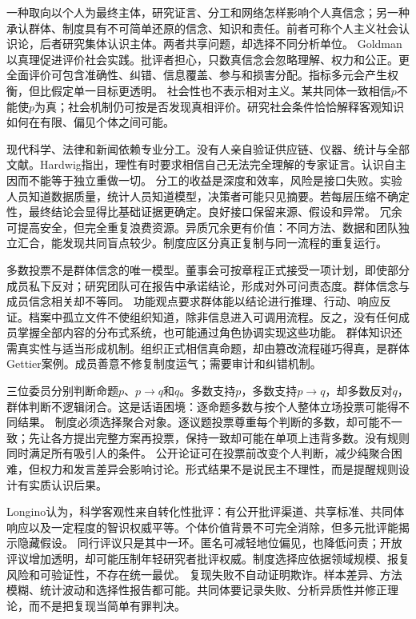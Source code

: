 一种取向以个人为最终主体，研究证言、分工和网络怎样影响个人真信念；另一种承认群体、制度具有不可简单还原的信念、知识和责任。前者可称个人主义社会认识论，后者研究集体认识主体。两者共享问题，却选择不同分析单位。 Goldman以真理促进评价社会实践\parencite{goldman1999}。批评者担心，只数真信念会忽略理解、权力和公正。更全面评价可包含准确性、纠错、信息覆盖、参与和损害分配。指标多元会产生权衡，但比假定单一目标更透明。 社会性也不表示相对主义。某共同体一致相信$p$不能使$p$为真；社会机制仍可按是否发现真相评价。研究社会条件恰恰解释客观知识如何在有限、偏见个体之间可能。

现代科学、法律和新闻依赖专业分工。没有人亲自验证供应链、仪器、统计与全部文献。Hardwig指出，理性有时要求相信自己无法完全理解的专家证言\parencite{hardwig1985}。认识自主因而不能等于独立重做一切。 分工的收益是深度和效率，风险是接口失败。实验人员知道数据质量，统计人员知道模型，决策者可能只见摘要。若每层压缩不确定性，最终结论会显得比基础证据更确定。良好接口保留来源、假设和异常。 冗余可提高安全，但完全重复浪费资源。异质冗余更有价值：不同方法、数据和团队独立汇合，能发现共同盲点较少。制度应区分真正复制与同一流程的重复运行。

多数投票不是群体信念的唯一模型。董事会可按章程正式接受一项计划，即使部分成员私下反对；研究团队可在报告中承诺结论，形成对外可问责态度。群体信念与成员信念相关却不等同。 功能观点要求群体能以结论进行推理、行动、响应反证。档案中孤立文件不使组织知道，除非信息进入可调用流程。反之，没有任何成员掌握全部内容的分布式系统，也可能通过角色协调实现这些功能。 群体知识还需真实性与适当形成机制。组织正式相信真命题，却由篡改流程碰巧得真，是群体Gettier案例。成员善意不修复制度运气；需要审计和纠错机制。

三位委员分别判断命题$p$、$p\rightarrow q$和$q$。多数支持$p$，多数支持$p\rightarrow q$，却多数反对$q$，群体判断不逻辑闭合。这是话语困境：逐命题多数与按个人整体立场投票可能得不同结果。 制度必须选择聚合对象。逐议题投票尊重每个判断的多数，却可能不一致；先让各方提出完整方案再投票，保持一致却可能在单项上违背多数。没有规则同时满足所有吸引人的条件。 公开论证可在投票前改变个人判断，减少纯聚合困难，但权力和发言差异会影响讨论。形式结果不是说民主不理性，而是提醒规则设计有实质认识后果。

Longino认为，科学客观性来自转化性批评：有公开批评渠道、共享标准、共同体响应以及一定程度的智识权威平等\parencite{longino1990}。个体价值背景不可完全消除，但多元批评能揭示隐藏假设。 同行评议只是其中一环。匿名可减轻地位偏见，也降低问责；开放评议增加透明，却可能压制年轻研究者批评权威。制度选择应依据领域规模、报复风险和可验证性，不存在统一最优。 复现失败不自动证明欺诈。样本差异、方法模糊、统计波动和选择性报告都可能。共同体要记录失败、分析异质性并修正理论，而不是把复现当简单有罪判决。

